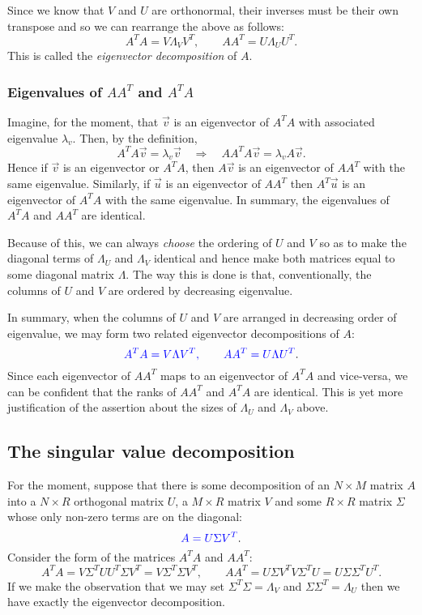 \documentclass[a4paper]{article}
\newcommand{\highlight}[1]{{\color{blue}#1}}
\begin{document}
Since we know that $V$ and $U$ are orthonormal, their inverses must be their own
transpose and so we can rearrange the above as follows:
\[
  A^TA = V \Lambda_V V^T, \qquad AA^T = U \Lambda_U U^T.
\]
This is called the \emph{eigenvector decomposition} of $A$. 

\subsubsection{Eigenvalues of $AA^T$ and $A^TA$}

Imagine, for the moment, that $\vec{v}$ is an eigenvector of $A^TA$ with
associated eigenvalue $\lambda_v$.
Then, by the definition,
\[
  A^TA\vec{v} = \lambda_v \vec{v}
  \quad \Rightarrow \quad
  AA^TA\vec{v} = \lambda_v A\vec{v}.
\]
Hence if $\vec{v}$ is an eigenvector or $A^TA$, then $A\vec{v}$ is an
eigenvector of $AA^T$ with the same eigenvalue. Similarly, if $\vec{u}$ is an
eigenvector of $AA^T$ then $A^T\vec{u}$ is an eigenvector of $A^TA$ with the
same eigenvalue. In summary, \highlight{the eigenvalues of $A^TA$ and $AA^T$ are
identical}.

Because of this, we can always \emph{choose} the ordering of $U$ and $V$ so as
to make the diagonal terms of $\Lambda_U$ and $\Lambda_V$ identical and hence
make both matrices equal to some diagonal matrix $\Lambda$. The way this is done
is that, conventionally, \highlight{the columns of $U$ and $V$ are ordered by
decreasing eigenvalue}.

In summary, when the columns of $U$ and $V$ are arranged in decreasing order of
eigenvalue, we may form two related eigenvector decompositions of $A$:
\[
  \highlight{A^TA = V \Lambda V^T, \qquad AA^T = U \Lambda U^T}.
\]
Since each eigenvector of $AA^T$ maps to an eigenvector of $A^TA$ and
vice-versa, we can be confident that the ranks of $AA^T$ and $A^TA$ are
identical. This is yet more justification of the assertion about the sizes of
$\Lambda_U$ and $\Lambda_V$ above.

\subsection{The singular value decomposition}

For the moment, suppose that there is some decomposition of an $N \times M$
matrix $A$ into a $N \times R$ orthogonal matrix $U$, a $M \times R$ matrix $V$
and some $R \times R$ matrix $\Sigma$ whose only non-zero terms are on the
diagonal:
\[
  \highlight{A = U \Sigma V^T}.
\]
Consider the form of the matrices $A^TA$ and $AA^T$:
\[
  A^TA = V \Sigma^T U U^T \Sigma V^T = V \Sigma^T \Sigma V^T, \qquad
  AA^T = U \Sigma V^T V \Sigma^T U = U \Sigma \Sigma^T U^T.
\]
If we make the observation that we may set $\Sigma^T \Sigma = \Lambda_V$ and
$\Sigma \Sigma^T = \Lambda_U$ then we have exactly the eigenvector
decomposition.
\end{document}
